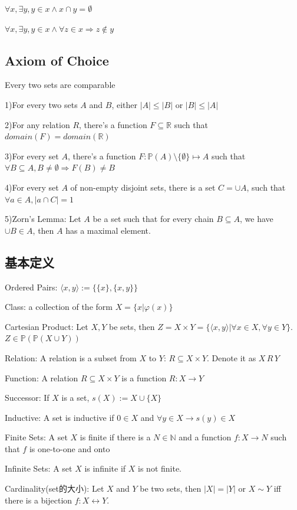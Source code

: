 \documentclass[12pt,a4paper]{ctexrep}
\begin{document}
$\forall x, \exists y, y \in x \wedge x\cap y = \emptyset$

$\forall x, \exists y, y \in x \wedge \forall z \in x \Rightarrow z \notin y$

\subsection{Axiom of Choice}
Every two sets are comparable

1)For every two sets $A$ and $B$, either $|A| \leqslant |B|$ or $|B|\leqslant|A|$

2)For any relation $R$, there's a function $F \subseteq \mathbb{R}$ such that $domain(F) = domain(\mathbb{R})$

3)For every set $A$, there's a function $F: \mathbb{P}(A) \setminus\{\emptyset\} \mapsto A$ such that $\forall B \subseteq A, B \neq \emptyset \Rightarrow F(B) \neq B$

4)For every set $A$ of non-empty disjoint sets, there is a set $C = \cup A$, such that $\forall a \in A, |a\cap C| = 1$

5)Zorn's Lemma: Let $A$ be a set such that for every chain $B \subseteq A$, we have $\cup B \in A$, then $A$ has a maximal element.
\subsection{基本定义}
Ordered Pairs: $\langle x,y\rangle := \{\{x\},\{x,y\}\}$

Class: a collection of the form $X=\{x|\varphi(x)\}$

Cartesian Product: Let $X,Y$ be sets, then $Z = X \times Y = \{\langle x,y\rangle|\forall x\in X, \forall y \in Y\}$. $Z \in \mathbb{P}(\mathbb{P}(X \cup Y))$

Relation: A relation is a subset from $X$ to $Y$: $R\subseteq X\times Y$. Denote it as $X\,R\,Y$

Function: A relation $R \subseteq X \times Y$ is a function $R:X \rightarrow Y$

Successor: If $X$ is a set, $s(X) := X \cup \{X\}$

Inductive: A set is inductive if $0\in X$ and $\forall y \in X \rightarrow s(y) \in X$

Finite Sets: A set $X$ is finite if there is a $N \in \mathbb{N}$ and a function $f:X \rightarrow N$ such that $f$ is one-to-one and onto

Infinite Sets: A set $X$ is infinite if $X$ is not finite.

Cardinality(set的大小): Let $X$ and $Y$ be two sets, then $|X| = |Y|$ or $X\sim Y$ iff there is a bijection $f:X \leftrightarrow Y$. 
\end{document}
